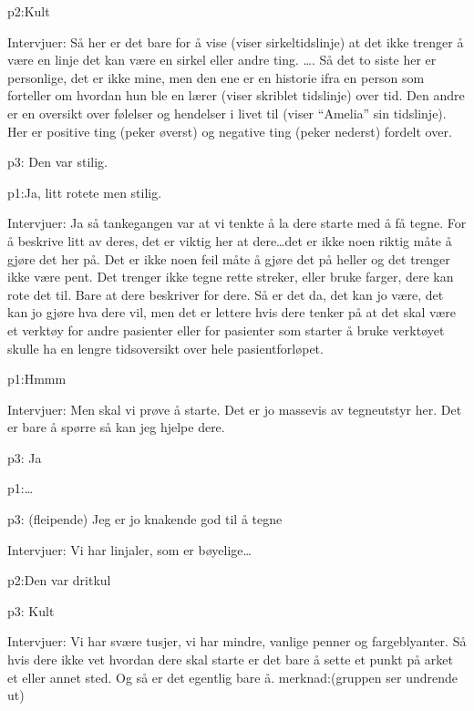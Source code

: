 \documentclass[11pt,UKenglish, a4paper]{article}
\begin{document}
\textcolor{myYellow} {p2:}Kult

\textcolor{myBlue} {Intervjuer:} Så her er det bare for å vise (viser sirkeltidslinje) at det ikke trenger å være en linje det kan være en sirkel eller andre ting. \dots. Så det to siste her er personlige, det er ikke mine, men den ene er en historie ifra en person som forteller om hvordan hun ble en lærer (viser skriblet tidslinje) over tid. Den andre er en oversikt over følelser og hendelser i livet til (viser ``Amelia'' sin tidslinje). Her er positive ting (peker øverst) og negative ting (peker nederst) fordelt over.

\textcolor{myR} {p3:} Den var stilig.

\textcolor{myGreen} {p1:}Ja, litt rotete men stilig.

\textcolor{myBlue} {Intervjuer:} Ja så tankegangen var at vi tenkte å la dere starte med å få tegne. For å beskrive litt av deres, det er viktig her at dere\dots det er ikke noen riktig måte å gjøre det her på. Det er ikke noen feil måte å gjøre det på heller og det trenger ikke være pent. Det trenger ikke tegne rette streker, eller bruke farger, dere kan rote det til. Bare at dere beskriver for dere. Så er det da, det kan jo være, det kan jo gjøre hva dere vil, men det er lettere hvis dere tenker på at det skal være et verktøy for andre pasienter eller for pasienter som starter å bruke verktøyet skulle ha en lengre tidsoversikt over hele pasientforløpet. 

\textcolor{myGreen} {p1:}Hmmm

\textcolor{myBlue} {Intervjuer:} Men skal vi prøve å starte. Det er jo massevis av tegneutstyr her. Det er bare å spørre så kan jeg hjelpe dere. 

\textcolor{myR} {p3:} Ja

\textcolor{myGreen} {p1:}\dots

\textcolor{myR} {p3:} (fleipende) Jeg er jo knakende god til å tegne

\textcolor{myBlue} {Intervjuer:} Vi har linjaler, som er bøyelige\dots

\textcolor{myYellow} {p2:}Den var dritkul

\textcolor{myR} {p3:} Kult

\textcolor{myBlue} {Intervjuer:} Vi har svære tusjer, vi har mindre, vanlige penner og fargeblyanter. Så hvis dere ikke vet hvordan dere skal starte er det bare å sette et punkt på arket et eller annet sted. Og så er det egentlig bare å. 
merknad:(gruppen ser undrende ut)
\end{document}
